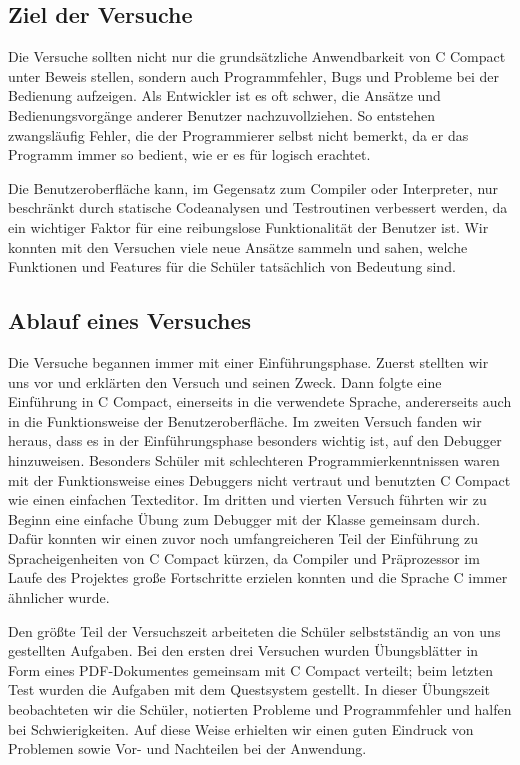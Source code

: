 \subsection{Ziel der Versuche}
Die Versuche sollten nicht nur die grundsätzliche Anwendbarkeit von C Compact unter Beweis stellen, sondern auch Programmfehler, Bugs und Probleme bei der Bedienung aufzeigen. Als Entwickler ist es oft schwer, die Ansätze und Bedienungsvorgänge anderer Benutzer nachzuvollziehen. So entstehen zwangsläufig Fehler, die der Programmierer selbst nicht bemerkt, da er das Programm immer so bedient, wie er es für logisch erachtet.

Die Benutzeroberfläche kann, im Gegensatz zum Compiler oder Interpreter, nur beschränkt durch statische Codeanalysen und Testroutinen verbessert werden, da ein wichtiger Faktor für eine reibungslose Funktionalität der Benutzer ist. Wir konnten mit den Versuchen viele neue Ansätze sammeln und sahen, welche Funktionen und Features für die Schüler tatsächlich von Bedeutung sind.

\subsection{Ablauf eines Versuches}
\label{sec:sci-trials-gui-sched}
Die Versuche begannen immer mit einer Einführungsphase. Zuerst stellten wir uns vor und erklärten den Versuch und seinen Zweck. Dann folgte eine Einführung in C Compact, einerseits in die verwendete Sprache, andererseits auch in die Funktionsweise der Benutzeroberfläche. Im zweiten Versuch fanden wir heraus, dass es in der Einführungsphase besonders wichtig ist, auf den Debugger hinzuweisen. Besonders Schüler mit schlechteren Programmierkenntnissen waren mit der Funktionsweise eines Debuggers nicht vertraut und benutzten C Compact wie einen einfachen Texteditor. Im dritten und vierten Versuch führten wir zu Beginn eine einfache Übung zum Debugger mit der Klasse gemeinsam durch. Dafür konnten wir einen zuvor noch umfangreicheren Teil der Einführung zu Spracheigenheiten von C Compact kürzen, da Compiler und Präprozessor im Laufe des Projektes große Fortschritte erzielen konnten und die Sprache C immer ähnlicher wurde.

Den größte Teil der Versuchszeit arbeiteten die Schüler selbstständig an von uns gestellten Aufgaben. Bei den ersten drei Versuchen wurden Übungsblätter in Form eines PDF-Dokumentes gemeinsam mit C Compact verteilt; beim letzten Test wurden die Aufgaben mit dem Questsystem gestellt. In dieser Übungszeit beobachteten wir die Schüler, notierten Probleme und Programmfehler und halfen bei Schwierigkeiten. Auf diese Weise erhielten wir einen guten Eindruck von Problemen sowie Vor- und Nachteilen bei der Anwendung.

